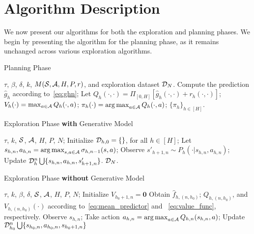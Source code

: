 \section{Algorithm Description}
\label{sec:alg}

We now present our algorithms for both the exploration and planning phases. We begin by presenting the algorithm for the planning phase, as it remains unchanged across various exploration algorithms.
\begin{algorithm}[ht]
   \caption{Planning Phase}
   \label{alg:plan}
\begin{algorithmic}
    $\tau$, $\beta$, $\delta$, $k$, $M(\mathcal{S},\mathcal{A}, H, P, r )$, and exploration dataset $\mathcal{D}_{N}$.
        \STATE Compute the prediction $\hat{g}_h$ according to~\eqref{eq:ghn};
        \STATE Let $Q_h(\cdot, \cdot) = \Pi_{[0,H]}[\hat{g}_h(\cdot, \cdot)+r_h(\cdot, \cdot)] $;
        \STATE $V_h(\cdot)= \max_{a\in\mathcal{A}}Q_h(\cdot, a)$;
        \STATE $\pi_h(\cdot) = \operatorname*{arg\,max}_{a\in\mathcal{A}}Q_h(\cdot,a)$;
   \ENDFOR
    $\{\pi_h\}_{h\in[H]}$. 
\end{algorithmic}
\end{algorithm}

\begin{algorithm}[ht]
\caption{Exploration Phase \textbf{with} Generative Model}\label{alg:exp_gen}
\begin{algorithmic}[1]
\REQUIRE $\tau$, $k$, $\mathcal{S}$, $\mathcal{A}$, $H$, $P$, $N$;
\STATE Initialize $\mathcal{D}_{h,0}=\{\}$, for all $h\in[H]$;
    \STATE Let $s_{h,n}, a_{h,n} = \operatorname*{arg\,max}_{s,a\in\mathcal{A}}\sigma_{h, n-1}(s,a)$;
    \STATE Observe $s'_{h+1,n}\sim P_h(\cdot|s_{h,n}, a_{h,n})$;
    \STATE Update $\mathcal{D}_h^n \bigcup\{s_{h,n}, a_{h,n}, s'_{h+1,n}\}$.
    \ENDFOR
\ENDFOR
{} $\mathcal{D}_{N}$. 
\end{algorithmic}
\end{algorithm}

\begin{algorithm}[ht]
\caption{Exploration Phase \textbf{without} Generative Model}\label{alg:exp2}
\begin{algorithmic}
\REQUIRE $\tau$, $k$, $\beta$, $\delta$, $\mathcal{S}$, $\mathcal{A}$, $H$, $P$, $N$;
    \STATE Initialize $V_{h_0+1,n}=\bm{0}$
        \STATE Obtain $\hat{f}_{h,(n,h_0)}$; $Q_{h, (n,h_0)}$, and $V_{h,(n,h_0)}(\cdot)$ according to~\eqref{eq:mean_predictor} and ~\eqref{eq:value_func}, respectively. 
    \ENDFOR
    \STATE Observe $s_{h,n}$; Take action $a_{h,n} = \operatorname*{arg\,max}_{a\in\mathcal{A}}Q_{h, n}(s_{h,n},a)$; 
    \ENDFOR
    \STATE Update $\mathcal{D}_{h_0}^n \bigcup\{s_{{h_0},n}, a_{h_0,n}, s_{h_0+1,n}\}$
    \ENDFOR
\ENDFOR
\end{algorithmic}
\end{algorithm}



